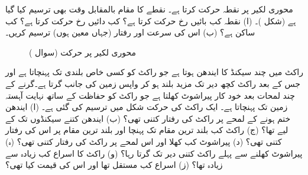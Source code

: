  محوری لکیر پر  نقطہ  حرکت کرتا ہے۔ نقطے  کا مقام بالمقابل وقت بھی ترسیم کیا گیا ہے (شکل )۔ (ا) نقطہ  کب بائیں رخ حرکت کرتا ہے؟ کب دائیں رخ حرکت کرتا ہے؟ کب ساکن ہے؟ (ب) اس کی سرعت اور رفتار (جہاں معین ہوں) ترسیم کریں۔ 
\begin{figure}
\centering
\begin{subfigure}{0.45\textwidth}
\centering
{}
\caption{}
\end{subfigure}\hfill
\begin{subfigure}{0.45\textwidth}
\centering
{}
\caption{}
\end{subfigure}
\caption{محوری لکیر پر حرکت (سوال )}
\label{شکل_سوال_تفرق_محوری_لکیر_پر_حرکت}
\end{figure}
راکٹ میں چند سیکنڈ کا ایندھن ہوتا ہے جو راکٹ  کو کسی خاص بلندی تک پہنچاتا ہے  اور جس کے بعد راکٹ کچھ دیر تک مزید بلند ہو کر واپس زمین کی جانب گرتا ہے۔گرنے کے چند لمحات بعد خود کار پیراشوٹ کھلتا ہے جو راکٹ کو حفاظت کے ساتھ نہایت آہستہ زمین تک پہنچاتا ہے۔ ایک راکٹ کی حرکت شکل  میں ترسیم کی گئی  ہے۔ (ا) ایندھن ختم ہونے کے لمحے پر راکٹ کی رفتار کتنی تھی؟ (ب) ایندھن کتنے سیکنڈوں تک کے لیے تھا؟ (ج)  راکٹ کب بلند ترین مقام تک پہنچا اور بلند ترین مقام پر اس کی رفتار کتنی تھی؟ (د) پیراشوٹ کب کھلا اور اس لمحے  پر راکٹ کی رفتار کتنی تھی؟ (ہ) پیراشوٹ  کھلنے سے پہلے راکٹ کتنی دیر تک گرتا رہا؟ (و) راکٹ کا  اسراع کب زیادہ سے زیادہ تھا؟ (ز) اسراع کب مستقل تھا اور اس کی قیمت کیا تھی؟
